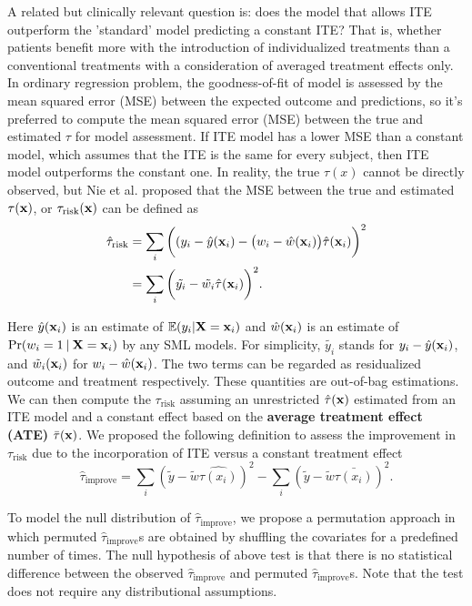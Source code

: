     A related but clinically relevant question is: does the model that allows ITE outperform the 'standard' model predicting a constant ITE? That is, whether patients benefit more with the introduction of individualized treatments than a conventional treatments with a consideration of averaged treatment effects only. In ordinary regression problem, the goodness-of-fit of model is assessed by the mean squared error (MSE) between the expected outcome and predictions, so it's preferred to compute the mean squared error (MSE) between the true and estimated $\tau$ for model assessment. If  ITE model has a lower MSE than a constant model, which assumes that the ITE is the same for every subject, then ITE model outperforms the constant one. In reality, the true $\tau(x)$ cannot be directly observed, but Nie et al. \cite{nie2017quasi} proposed that the MSE between the true and estimated $\tau(\mathbf{x})$, or $\tau_\mathrm{risk}(\mathrm{\mathbf{x}})$ can be defined as 
    \begin{equation}
      \begin{split}
        \hat{\tau}_\mathrm{risk} & = \sum_{i} \bigg ( (y_i - \hat{y}(\mathbf{x}_i) - \big (w_i - \hat{w}(\mathbf{x}_i) \big) \hat{\tau}(\mathbf{x}_i) \bigg ) ^2 \\
        & = \sum_{i} \bigg( \tilde{y_i} - \tilde{w_i} \hat{\tau}(\mathbf{x}_i) \bigg )^2.
      \end{split}
    \end{equation}

    Here $\hat{y}(\mathbf{x}_i)$ is an estimate of $\mathbb{E}(y_i|\mathbf{X}=\mathbf{x}_i)$ and $\hat{w}(\mathbf{x}_i)$ is an estimate of $\Pr(w_i=1 \:\vert\: \mathbf{X}=\mathbf{x}_i)$ by any SML models. For simplicity, $\tilde{y_i}$ stands for $y_i - \hat{y}(\mathbf{x}_i)$, and $\tilde{w}_i (\mathbf{x}_i)$ for $w_i - \hat{w}(\mathbf{x}_i)$. The two terms can be regarded as residualized outcome and treatment respectively. These quantities are out-of-bag estimations. We can then compute the $\tau_\mathrm{risk}$ assuming an unrestricted $\hat{\tau}(\mathbf{x})$ estimated from an ITE model and a constant effect based on the \textbf{average treatment effect (ATE)} $\bar{\tau}(\mathbf{x})$. We proposed the following definition to assess the improvement in $\tau_\mathrm{risk}$ due to the incorporation of ITE versus a constant treatment effect
    \begin{equation}
      \hat{\tau}_\mathrm{improve} = \sum_{i}(\tilde{y} - \tilde{w} \hat{\tau(x_i)})^2 - \sum_{i}(\tilde{y} - \tilde{w} \bar{\tau(x_i)})^2.
    \end{equation}

    To model the null distribution of $\hat{\tau}_\mathrm{improve}$, we propose a permutation approach in which permuted $\hat{\tau}_\mathrm{improve}$s are obtained by shuffling the covariates for a predefined number of times. The null hypothesis of above test is that there is no statistical difference between the observed $\hat{\tau}_\mathrm{improve}$ and permuted $\hat{\tau}_\mathrm{improve}$s. Note that the test does not require any distributional assumptions.
    
